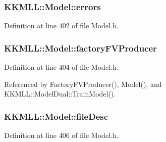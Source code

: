 \subsubsection[{\texorpdfstring{errors}{errors}}]{ K\+K\+M\+L\+L\+::\+Model\+::errors\hspace{0.3cm}{\ttfamily [protected]}}\hypertarget{class_k_k_m_l_l_1_1_model_accef16f148db89f22ae5d0ee19828877}{}\label{class_k_k_m_l_l_1_1_model_accef16f148db89f22ae5d0ee19828877}


Definition at line 402 of file Model.\+h.

\subsubsection[{\texorpdfstring{factory\+F\+V\+Producer}{factoryFVProducer}}]{ K\+K\+M\+L\+L\+::\+Model\+::factory\+F\+V\+Producer\hspace{0.3cm}{\ttfamily [protected]}}\hypertarget{class_k_k_m_l_l_1_1_model_a8a523b3f8a31f04da39e2e673bc6bbcb}{}\label{class_k_k_m_l_l_1_1_model_a8a523b3f8a31f04da39e2e673bc6bbcb}


Definition at line 404 of file Model.\+h.



Referenced by Factory\+F\+V\+Producer(), Model(), and K\+K\+M\+L\+L\+::\+Model\+Dual\+::\+Train\+Model().

\subsubsection[{\texorpdfstring{file\+Desc}{fileDesc}}]{ K\+K\+M\+L\+L\+::\+Model\+::file\+Desc\hspace{0.3cm}{\ttfamily [protected]}}\hypertarget{class_k_k_m_l_l_1_1_model_a65c48cd3601efe64e1431beba55e24f4}{}\label{class_k_k_m_l_l_1_1_model_a65c48cd3601efe64e1431beba55e24f4}


Definition at line 406 of file Model.\+h.



